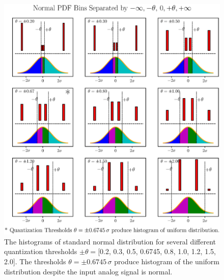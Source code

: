 \documentclass[letterpaper,twoside,12pt]{article}
\begin{document}
\begin{figure}[ht!]
  \begin{center}
  \includegraphics[width=45pc]{fig_various_bin_size_histograms.eps}
  \caption{\small The histograms of standard normal distribution for several different quantization thresholds $\pm\theta = $[0.2, 0.3, 0.5, 0.6745, 0.8, 1.0, 1.2, 1.5, 2.0]. The thresholds $\theta = \pm 0.6745 \, \sigma$ produce histogram of the uniform distribution despite the input analog signal is normal.}
  \label{var_bins_hists}
  \end{center}
\end{figure}
\end{document}
